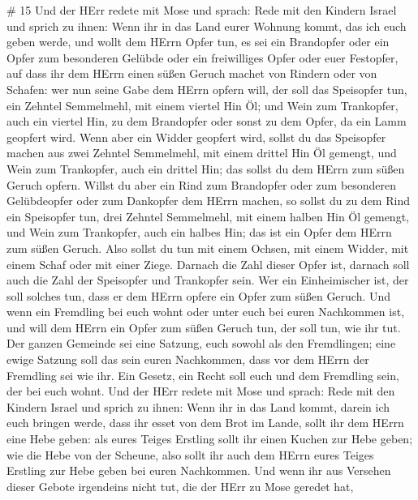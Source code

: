 \# 15  Und der HErr redete mit Mose und sprach: 
Rede mit den Kindern Israel und sprich zu ihnen: Wenn ihr in das Land
eurer Wohnung kommt, das ich euch geben werde,  und wollt
dem HErrn Opfer tun, es sei ein Brandopfer oder ein Opfer zum besonderen
Gelübde oder ein freiwilliges Opfer oder euer Festopfer, auf dass ihr
dem HErrn einen süßen Geruch machet von Rindern oder von Schafen:
 wer nun seine Gabe dem HErrn opfern will, der soll das
Speisopfer tun, ein Zehntel Semmelmehl, mit einem viertel Hin Öl;
 und Wein zum Trankopfer, auch ein viertel Hin, zu dem
Brandopfer oder sonst zu dem Opfer, da ein Lamm geopfert wird.
 Wenn aber ein Widder geopfert wird, sollst du das
Speisopfer machen aus zwei Zehntel Semmelmehl, mit einem drittel Hin Öl
gemengt,  und Wein zum Trankopfer, auch ein drittel Hin; das
sollst du dem HErrn zum süßen Geruch opfern.  Willst du aber
ein Rind zum Brandopfer oder zum besonderen Gelübdeopfer oder zum
Dankopfer dem HErrn machen,  so sollst du zu dem Rind ein
Speisopfer tun, drei Zehntel Semmelmehl, mit einem halben Hin Öl
gemengt,  und Wein zum Trankopfer, auch ein halbes Hin; das
ist ein Opfer dem HErrn zum süßen Geruch.  Also sollst du
tun mit einem Ochsen, mit einem Widder, mit einem Schaf oder mit einer
Ziege.  Darnach die Zahl dieser Opfer ist, darnach soll
auch die Zahl der Speisopfer und Trankopfer sein.  Wer ein
Einheimischer ist, der soll solches tun, dass er dem HErrn opfere ein
Opfer zum süßen Geruch.  Und wenn ein Fremdling bei euch
wohnt oder unter euch bei euren Nachkommen ist, und will dem HErrn ein
Opfer zum süßen Geruch tun, der soll tun, wie ihr tut.  Der
ganzen Gemeinde sei eine Satzung, euch sowohl als den Fremdlingen; eine
ewige Satzung soll das sein euren Nachkommen, dass vor dem HErrn der
Fremdling sei wie ihr.  Ein Gesetz, ein Recht soll euch und
dem Fremdling sein, der bei euch wohnt.  Und der HErr
redete mit Mose und sprach:  Rede mit den Kindern Israel
und sprich zu ihnen: Wenn ihr in das Land kommt, darein ich euch bringen
werde,  dass ihr esset von dem Brot im Lande, sollt ihr dem
HErrn eine Hebe geben:  als eures Teiges Erstling sollt ihr
einen Kuchen zur Hebe geben; wie die Hebe von der Scheune, 
also sollt ihr auch dem HErrn eures Teiges Erstling zur Hebe geben bei
euren Nachkommen.  Und wenn ihr aus Versehen dieser Gebote
irgendeins nicht tut, die der HErr zu Mose geredet hat, 
